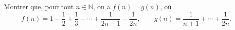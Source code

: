 Montrer que, pour tout $n \in \mathbb{N}$, on a $f(n) = g(n)$, où
\[ f(n) = 1 - \frac{1}{2} + \frac{1}{3} - \cdots + \frac{1}{2n - 1} - \frac{1}{2n},\qquad g(n) = \frac{1}{n + 1} + \cdots + \frac{1}{2n}. \]
